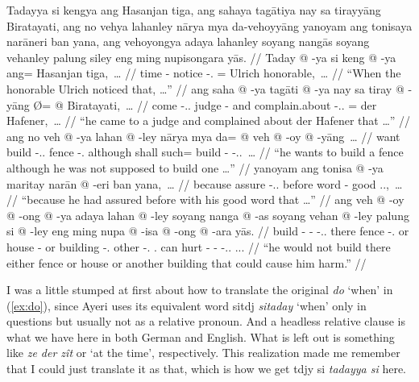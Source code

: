 \documentclass[12pt,paper=a4]{scrartcl}
\newcommand{\fw}[1]{\textit{#1}} %
\newcommand{\ayr}[1]{{\Tagati #1}}
\newcommand{\xayr}[3]{{\Tagati #1} \emph{#2} \enquote*{#3}}
\begin{document}
\pex
	\glpreamble Tadayya si kengya ang Hasanjan tiga, ang sahaya tagātiya nay 
		sa tirayyāng Birata\-yati, ang no vehya lahanley nārya mya 
		da-vehoyyāng yanoyam ang tonisaya narāneri ban yana, ang 
		vehoyongya adaya lahanley soyang nangās soyang vehanley palung 
		siley eng ming nupisongara yās. //
	\a \label{ex:do} \begingl
		\gla Taday @ -ya si keng @ -ya ang= Hasanjan tiga,~… //
		\glb time -\Loc{} \Rel{} notice -\Tsg{}.\M{} \Aarg{}= Ulrich 
			honorable,~… //
		\glft \enquote{When the honorable Ulrich noticed that, …} //
	\endgl
	\a \begingl
		\gla ang saha @ -ya tagāti @ -ya nay sa tiray @ -yāng Ø= @ 
			{Biratayati},~… //
		\glb \AgtT{} come -\Tsg{}.\M{}.\Top{} judge -\Loc{} and \PatT{} 
			complain.about -\Tsg{}.\M{}.\Aarg{} \Top{}= {der 
			Hafener,}~… //
		\glft \enquote{he came to a judge and complained about der 
			Hafener that …} //
	\endgl
	\a \begingl
		\gla ang no veh @ -ya lahan @ -ley nārya mya da= @ veh @ -oy @ 
			-yāng~… //
		\glb \AgtT{} want build -\Tsg{}.\M{}.\Top{} fence 
			-\Parg{}.\Inan{} although shall such= build 
			-\Neg{} -\Tsg{}.\M{}.\Aarg{}~… //
		\glft \enquote{he wants to build a fence although he was not 
			supposed to build one …} //
	\endgl
	\a \begingl
		\gla yanoyam ang tonisa @ -ya maritay narān @ -eri ban yana,~… //
		\glb because \AgtT{} assure -\Tsg{}.\M{}.\Top{} before word 
			-\Ins{} good \Tsg{}.\M{}.\Gen{},~… //
		\glft \enquote{because he had assured before with his good word 
			that …} //
	\endgl
	\a \begingl
		\gla ang veh @ -oy @ -ong @ -ya adaya lahan @ -ley soyang nanga 
			@ -as soyang vehan @ -ley palung si @ -ley eng ming nupa 
			@ -isa @ -ong @ -ara yās. //
		\glb \AgtT{} build -\Neg{} -\Irr{} -\Tsg{}.\M{}.\Top{} there 
			fence -\Parg{}.\Inan{} or house -\Parg{} or building 
			-\Parg{}.\Inan{} other \Rel{} -\Parg{}.\Inan{} 
			\AgtT{}.\Inan{} can hurt -\Caus{} -\Irr{} 
			-\Tsg{}.\Inan{}.\Top{} \Tsg{}.\M{}.\Parg{}. //
		\glft \enquote{he would not build there either fence or house or 
			another building that could cause him harm.} //
	\endgl
\xe

I was a little stumped at first about how to translate the original \fw{do} 
`when' in (\ref{ex:do}), since Ayeri uses its equivalent word 
\xayr{sitdj}{sitaday}{when} only in questions but usually not as a relative 
pronoun. And a headless relative clause is what we have here in both German and 
English. What is left out is something like \fw{ze der zît} or `at the time', 
respectively. This realization made me remember that I could just translate it 
as that, which is how we get \ayr{tdjy si} \fw{tadayya si} here.
\end{document}
